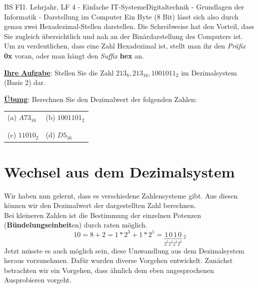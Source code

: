 \documentclass[11pt,twocolumn,oneside,openany,headings=optiontotoc,11pt,numbers=noenddot]{article}
\begin{document}
\begin{worksheet}{BS FI}{1. Lehrjahr, LF 4 - Einfache IT-Systeme}{Digitaltechnik - Grundlagen der Informatik - Darstellung im Computer}
		Ein Byte (8 Bit) lässt sich also durch genau zwei Hexadezimal-Stellen darstellen. Die Schreibweise hat den Vorteil, dass Sie zugleich übersichtlich und nah an der Binärdarstellung des Computers ist.\\
		Um zu verdeutlichen, dass eine Zahl Hexadezimal ist, stellt man ihr den \textit{Präfix} \textbf{0x} voran, oder man hängt den \textit{Suffix} \textbf{hex} an.\\
		\par\noindent
		\textbf{\underline{Ihre Aufgabe}}: Stellen Sie die Zahl \(213_{8}, 213_{16}, 1001011_{2}\) im Dezimalsystem (Basis 2) dar.\\
		\par\noindent
		\textbf{\underline{Übung}}: Berechnen Sie den Dezimalwert der folgenden Zahlen:\\
		\par\noindent
		\begin{tabularx}{0.45\textwidth}{M|M}
			(a) \(A73_{16}\) & (b) \(1001101_{2}\)\\
			& \\
			\hline
			& \\
			(c) \(11010_{2}\) & (d) \(D5_{16}\)\\
		\end{tabularx}
		\newpage
		\section{Wechsel aus dem Dezimalsystem}
		Wir haben nun gelernt, dass es verschiedene Zahlensysteme gibt. Aus diesen können wir den Dezimalwert der dargestellten Zahl berechnen.\\
		Bei kleineren Zahlen ist die Bestimmung der einzelnen Potenzen (\textbf{Bündelungseinheit}en) durch raten möglich.\\
		\[10 = 8 + 2 = 1*2^3 + 1*2^1 = \underbrace{1}_{2^3}\underbrace{0}_{2^2}\underbrace{1}_{2^2}\underbrace{0}_{2^0}\ _{2}\]
		Jetzt müsste es auch möglich sein, diese Umwandlung aus dem Dezimalsystem heraus vorzunehmen. Dafür wurden diverse Vorgehen entwickelt. Zunächst betrachten wir ein Vorgehen, dass ähnlich dem eben angesprochenen \grq{}Ausprobieren\grq{} vorgeht.\\

\end{worksheet}
\end{document}
